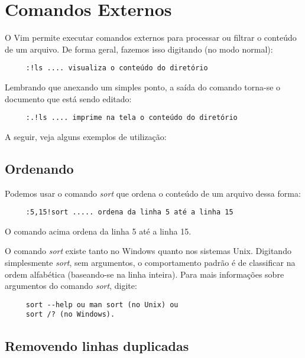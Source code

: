 
\chapter{Comandos Externos}
O Vim permite executar comandos externos para processar ou filtrar o
conteúdo de um arquivo. De forma geral, fazemos isso digitando (no
modo normal):

\begin{verbatim}
     :!ls .... visualiza o conteúdo do diretório
\end{verbatim}

Lembrando que anexando um simples ponto, a saída do comando torna-se o 
documento que está sendo editado:

\begin{verbatim}
     :.!ls .... imprime na tela o conteúdo do diretório
\end{verbatim}

A seguir, veja alguns exemplos de utilização:

\section{Ordenando}
Podemos usar o comando {\em sort} que ordena o conteúdo de um arquivo dessa forma:

\begin{verbatim}
     :5,15!sort ..... ordena da linha 5 até a linha 15
\end{verbatim}

O comando acima ordena da linha 5 até a linha 15.

O comando {\em sort} existe tanto no Windows quanto nos sistemas Unix.
Digitando simplesmente {\em sort}, sem argumentos, o comportamento padrão
é de classificar na ordem alfabética (baseando-se na linha inteira).
Para mais informações sobre argumentos do comando {\em sort}, digite:

\begin{verbatim}
     sort --help ou man sort (no Unix) ou
     sort /? (no Windows).
\end{verbatim}

\section{Removendo linhas duplicadas}

